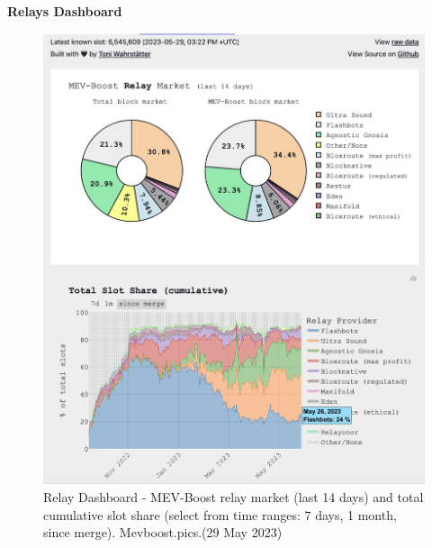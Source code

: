 \documentclass[UTF8]{article}
\begin{document}
{\textbf{Relays Dashboard}
\begin{figure}[htbp]
\begin{center}
\includegraphics[width=0.85\linewidth]{images/mevrelay1}
\caption{Relay Dashboard - MEV-Boost relay market (last 14 days) and total cumulative slot share (select from time ranges: 7 days, 1 month, since merge). Mevboost.pics.(29 May 2023)}
\label{fig:mevrelay1}
\end{center}
\end{figure}

}
\end{document}

